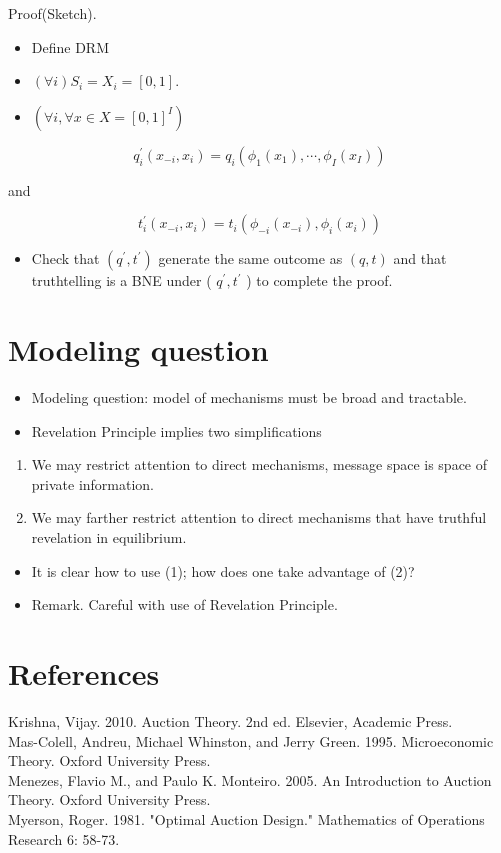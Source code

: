 \documentclass[10pt]{article}
\begin{document}
Proof(Sketch).

\begin{itemize}
  \item Define DRM
  \item $(\forall i) S_{i}=X_{i}=[0,1]$.
  \item $\left(\forall i, \forall x \in X=[0,1]^{I}\right)$
\end{itemize}

$$
q_{i}^{\prime}\left(x_{-i}, x_{i}\right)=q_{i}\left(\phi_{1}\left(x_{1}\right), \cdots, \phi_{I}\left(x_{I}\right)\right)
$$

and

$$
t_{i}^{\prime}\left(x_{-i}, x_{i}\right)=t_{i}\left(\phi_{-i}\left(x_{-i}\right), \phi_{i}\left(x_{i}\right)\right)
$$

\begin{itemize}
  \item Check that $\left(q^{\prime}, t^{\prime}\right)$ generate the same outcome as $(q, t)$ and that truthtelling is a BNE under ( $q^{\prime}, t^{\prime}$ ) to complete the proof.
\end{itemize}

\section*{Modeling question}
\begin{itemize}
  \item Modeling question: model of mechanisms must be broad and tractable.
  \item Revelation Principle implies two simplifications
\end{itemize}

\begin{enumerate}
  \item We may restrict attention to direct mechanisms, message space is space of private information.
  \item We may farther restrict attention to direct mechanisms that have truthful revelation in equilibrium.
\end{enumerate}

\begin{itemize}
  \item It is clear how to use (1); how does one take advantage of (2)?
  \item Remark. Careful with use of Revelation Principle.
\end{itemize}

\section*{References}
Krishna, Vijay. 2010. Auction Theory. 2nd ed. Elsevier, Academic Press.\\
Mas-Colell, Andreu, Michael Whinston, and Jerry Green. 1995. Microeconomic Theory. Oxford University Press.\\
Menezes, Flavio M., and Paulo K. Monteiro. 2005. An Introduction to Auction Theory. Oxford University Press.\\
Myerson, Roger. 1981. "Optimal Auction Design." Mathematics of Operations Research 6: 58-73.
\end{document}
